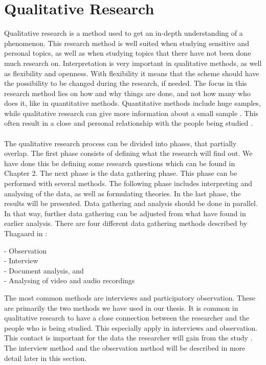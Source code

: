 \section{Qualitative Research}
Qualitative research is a method used to get an in-depth understanding of a phenomenon. This research method is well suited when studying sensitive and personal topics, as well as when studying topics that there have not been done much research on. Interpretation is very important in qualitative methods, as well as flexibility and openness. With flexibility it means that the scheme should have the possibility to be changed during the research, if needed. The focus in this research method lies on how and why things are done, and not how many who does it, like in quantitative methods. Quantitative methods include huge samples, while qualitative research can give more information about a small sample \cite{qualitative}. This often result in a close and personal relationship with the people being studied \cite{tjora}.  \\ \\
The qualitative research process can be divided into phases, that partially overlap. The first phase consists of defining what the research will find out. We have done this be defining some research questions which can be found in Chapter 2. The next phase is the data gathering phase. This phase can be performed with several methods. The following phase includes interpreting and analysing of the data, as well as formulating theories. In the last phase, the results will be presented. Data gathering and analysis should be done in parallel. In that way, further data gathering can be adjusted from what have found in earlier analysis. There are four different data gathering methods described by Thagaard in \cite{qualitative}:

- Observation \\
- Interview \\ 
- Document analysis, and \\
- Analysing of video and audio recordings

The most common methods are interviews and participatory observation. These are primarily the two methods we have used in our thesis. It is common in qualitative research to have a close connection between the researcher and the people who is being studied. This especially apply in interviews and observation. This contact is important for the data the researcher will gain from the study \cite{qualitative}. The interview method and the observation method will be described in more detail later in this section.

